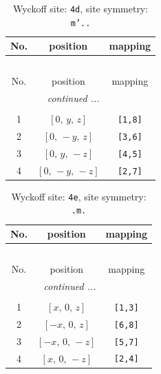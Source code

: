 \documentclass[fleqn,8pt]{jsarticle}
\begin{document}
\begin{longtable}{ccc}
\caption{Wyckoff site: {\tt 4d}, site symmetry: {\tt m'..}}
 \\
 \hline \hline
No. & position & mapping \\ \hline \endfirsthead

\multicolumn{2}{l}{\tablename\ \thetable{}} \\
 \hline \hline
No. & position & mapping \\ \hline \endhead

 \hline \hline
\multicolumn{2}{r}{\footnotesize\it continued ...} \\ \endfoot

 \hline \hline
\multicolumn{2}{r}{} \\ \endlastfoot

1 & $\left[ 0,\, y,\, z \right]$ & {\tt [1,8]} \\ \hline
2 & $\left[ 0,\, - y,\, z \right]$ & {\tt [3,6]} \\ \hline
3 & $\left[ 0,\, y,\, - z \right]$ & {\tt [4,5]} \\ \hline
4 & $\left[ 0,\, - y,\, - z \right]$ & {\tt [2,7]} \\
\end{longtable}
\renewcommand{\arraystretch}{1.2}
\begin{longtable}{ccc}
\caption{Wyckoff site: {\tt 4e}, site symmetry: {\tt .m.}}
 \\
 \hline \hline
No. & position & mapping \\ \hline \endfirsthead

\multicolumn{2}{l}{\tablename\ \thetable{}} \\
 \hline \hline
No. & position & mapping \\ \hline \endhead

 \hline \hline
\multicolumn{2}{r}{\footnotesize\it continued ...} \\ \endfoot

 \hline \hline
\multicolumn{2}{r}{} \\ \endlastfoot

1 & $\left[ x,\, 0,\, z \right]$ & {\tt [1,3]} \\ \hline
2 & $\left[ - x,\, 0,\, z \right]$ & {\tt [6,8]} \\ \hline
3 & $\left[ - x,\, 0,\, - z \right]$ & {\tt [5,7]} \\ \hline
4 & $\left[ x,\, 0,\, - z \right]$ & {\tt [2,4]} \\
\end{longtable}
\renewcommand{\arraystretch}{1.2}
\end{document}
